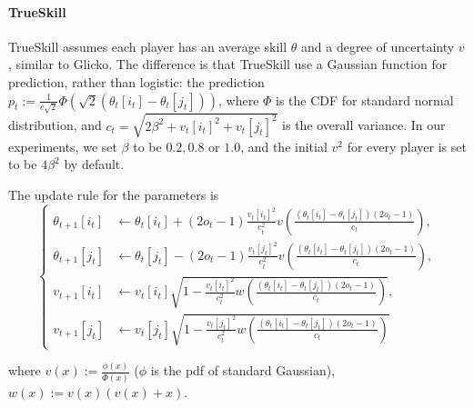 \paragraph{TrueSkill} TrueSkill \citep{dangauthier2007trueskill} assumes each player 
has an average skill $\theta$ and a degree of uncertainty  $v$, similar to Glicko. The difference is that TrueSkill use a Gaussian function for prediction, rather than logistic: the prediction $p_t:=\frac{1}{c\sqrt{2}}\Phi(\sqrt{2}( \theta_t[i_t]-\theta_t[j_t]))$, where $\Phi$ is the CDF for standard normal distribution, and $c_t = \sqrt{2\beta^2 + v_{t}[i_t]^2 + v_{t}[j_t]^2}$ is the overall variance. 
In our experiments, we set $\beta$ to be $0.2,0.8$ or $1.0$, and the initial $v^2$ for every player is set to be $4 \beta^2$ by default.


The update rule for the parameters is 
\begin{equation}
    \begin{cases}
    \theta_{t+1}[i_t] &\gets \theta_{t}[i_t] + (2 o_t - 1) \frac{v_{t}[i_t]^2}{c_t^2} v(\frac{( \theta_t[i_t]-\theta_t[j_t])(2 o_t - 1)}{c_t}),\\
    \theta_{t+1}[j_t] &\gets \theta_{t}[j_t] - (2 o_t - 1) \frac{v_{t}[j_t]^2}{c_t^2} v(\frac{( \theta_t[i_t]-\theta_t[j_t])(2 o_t - 1)}{c_t}),\\
    v_{t+1}[i_t] &\gets v_{t}[i_t] \sqrt{1- \frac{v_{t}[i_t]^2}{c_t^2} w(\frac{( \theta_t[i_t]-\theta_t[j_t])(2 o_t - 1)}{c_t})}, \\
    v_{t+1}[j_t] &\gets v_{t}[j_t] \sqrt{1- \frac{v_{t}[j_t]^2}{c_t^2} w(\frac{( \theta_t[i_t]-\theta_t[j_t])(2 o_t - 1)}{c_t})}  
    \end{cases}
\end{equation}

where $v(x):= \frac{\phi(x)}{\Phi(x)}$ ($\phi$ is the pdf of standard Gaussian), $w(x):=v(x)(v(x)+x)$. 


 


